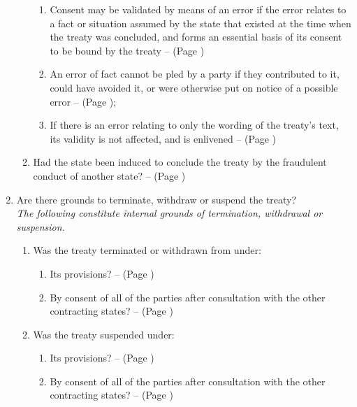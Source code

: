 \begin{enumerate}
\begin{enumerate}
\begin{enumerate}
            \item Consent may be validated by means of an error if the error relates to a fact or situation assumed by the state that existed at the time when the treaty was concluded, and forms an essential basis of its consent to be bound by the treaty --  (Page \pageref{VCLT Art 48})
            \item An error of fact cannot be pled by a party if they contributed to it, could have avoided it, or were otherwise put on notice of a possible error --  (Page \pageref{VCLT Art 48}); 
            \item If there is an error relating to only the wording of the treaty's text, its validity is not affected, and  is enlivened --  (Page \pageref{VCLT Art 48})
        \end{enumerate}
        \item Had the state been induced to conclude the treaty by the fraudulent conduct of another state? --  (Page \pageref{VCLT Art 49})
    \end{enumerate}
    \item Are there grounds to terminate, withdraw or suspend the treaty? \\\vspace{8pt}
    \textit{The following constitute internal grounds of termination, withdrawal or suspension.}
    \begin{enumerate}
        \item Was the treaty terminated or withdrawn from under:
        \begin{enumerate}
            \item Its provisions? --  (Page \pageref{VCLT Art 54})
            \item By consent of all of the parties after consultation with the other contracting states? --  (Page \pageref{VCLT Art 54})
        \end{enumerate}
        \item Was the treaty suspended under:
        \begin{enumerate}
            \item Its provisions? --  (Page \pageref{VCLT Art 57})
            \item By consent of all of the parties after consultation with the other contracting states? --  (Page \pageref{VCLT Art 57})

\end{enumerate}
\end{enumerate}
\end{enumerate}
